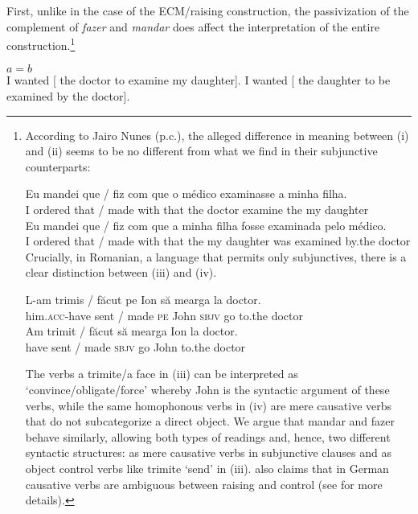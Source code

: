 \documentclass[output=paper]{langsci/langscibook}
\begin{document}
First, unlike in the case of the ECM\slash raising construction, the passivization of the complement of \textit{fazer} and \textit{mandar} does affect the interpretation of the entire construction.\footnote{According to Jairo Nunes (p.c.), the alleged difference in meaning between (i) and (ii) seems to be no different from what we find in their subjunctive counterparts: 

\ea \gll Eu mandei que / fiz      com que o    médico examinasse a    minha filha.\\
	I    ordered that / made with that         the doctor  examine      the my      daughter\\
\z
\ea
\gll Eu  mandei  que / fiz      com que a    minha filha        fosse examinada pelo     médico.\\
	I     ordered  that / made with that         the my     daughter  was   examined   by.the doctor\\
\z
Crucially, in Romanian, a language that permits only subjunctives, there is a clear distinction between (iii) and (iv). 

\ea \gll L-am              trimis / făcut     pe Ion   să     mearga la       doctor.\\
         him.\textsc{acc}-have sent / made      \textsc{pe} John \textsc{sbjv} go         to.the doctor\\
\z
\ea \gll Am trimit / făcut să     mearga Ion  la       doctor.\\
         have sent / made \textsc{sbjv} go        John to.the doctor\\
\z

The verbs a trimite\slash a face in (iii) can be interpreted as ‘convince\slash obligate\slash force’ whereby John is the syntactic  argument of these verbs, while the same homophonous verbs in (iv) are mere causative verbs that do not subcategorize a direct object. We argue that mandar and fazer behave similarly, allowing both types of readings and, hence, two different syntactic structures: as mere causative verbs in subjunctive clauses and as object control verbs like trimite ‘send’ in (iii). \citet{Wurmbrand2001} also claims that in German causative verbs are ambiguous between raising and control (see \citet{Wurmbrand2001} for more details).}

\ea%
    $a = b$ \citep[119]{Farrell1995}\label{ex:moreno:9}\\
    \ea I wanted [ the doctor to examine my daughter].
    \ex I wanted [ the daughter to be examined by the doctor].
    \z
\z
\end{document}
